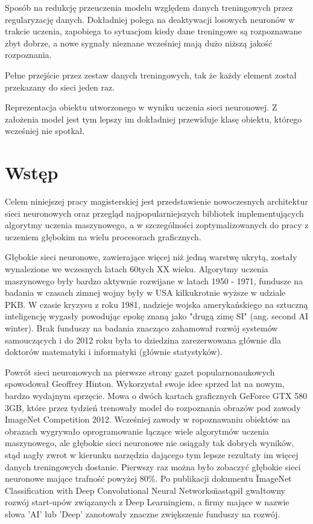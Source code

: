 \documentclass[12pt,a4paper,twoside,titlepage,openright]{book}
\begin{document}
\begin{description}[style=nextline]
	\item[Wyrzucanie połączeń (ang. dropout)] Sposób na redukcję przeuczenia modelu względem danych treningowych przez regularyzację danych. Dokładniej polega na deaktywacji losowych neuronów w trakcie uczenia, zapobiega to sytuacjom kiedy dane treningowe są rozpoznawane zbyt dobrze, a nowe sygnały nieznane wcześniej mają dużo niższą jakość rozpoznania.
	\item[Epoka] Pełne przejście przez zestaw danych treningowych, tak że każdy element został przekazany do sieci jeden raz.
	\item[Model] Reprezentacja obiektu utworzonego w wyniku uczenia sieci neuronowej. Z założenia model jest tym lepszy im dokładniej przewiduje klasę obiektu, którego wcześniej nie spotkał.
\end{description}
 

\chapter*{Wstęp}
Celem niniejszej pracy magisterskiej jest przedstawienie nowoczesnych architektur sieci neuronowych oraz przegląd najpopularniejszych bibliotek implementujących algorytmy uczenia maszynowego, a w szczególności zoptymalizowanych do pracy z uczeniem głębokim na wielu procesorach graficznych. 

Głębokie sieci neuronowe, zawierające więcej niż jedną warstwę ukrytą, zostały wynalezione we wczesnych latach 60tych XX wieku. Algorytmy uczenia maszynowego były bardzo aktywnie rozwijane w latach 1950 - 1971, fundusze na badania w czasach zimnej wojny były w USA kilkukrotnie wyższe w udziale PKB. W czasie kryzysu z roku 1981, nadzieje wojska amerykańskiego na sztuczną inteligencję wygasły powodując epokę znaną jako "drugą zimę SI" (ang. second AI winter). Brak funduszy na badania znacząco zahamował rozwój systemów samouczących i do 2012 roku była to dziedzina zarezerwowana głównie dla doktorów matematyki i informatyki (głównie statystyków). 

Powrót sieci neuronowych na pierwsze strony gazet popularnonaukowych spowodował Geoffrey Hinton. Wykorzystał swoje idee sprzed lat na nowym, bardzo wydajnym sprzęcie. Mowa o dwóch kartach graficznych GeForce GTX 580 3GB\cite{NIPS2012_4824}, które przez tydzień trenowały model do rozpoznania obrazów pod zawody ImageNet Competition 2012. Wcześniej zawody w ropoznawaniu obiektów na obrazach wygrywało oprogramowanie łączące wiele algorytmów uczenia maszynowego, ale głębokie sieci neuronowe nie osiągały tak dobrych wyników, stąd nagły zwrot w kierunku narzędzia dającego tym lepsze rezultaty im więcej danych treningowych dostanie. Pierwszy raz można było zobaczyć głębokie sieci neuronowe mające trafność powyżej 80\%. Po publikacji dokumentu \"ImageNet Classification with Deep Convolutional Neural Networks\" nastąpił gwałtowny rozwój start-upów związanych z Deep Learningiem, a firmy mające w nazwie słowa 'AI' lub 'Deep' zanotowały znaczne zwiększenie funduszy na rozwój.
\end{document}
